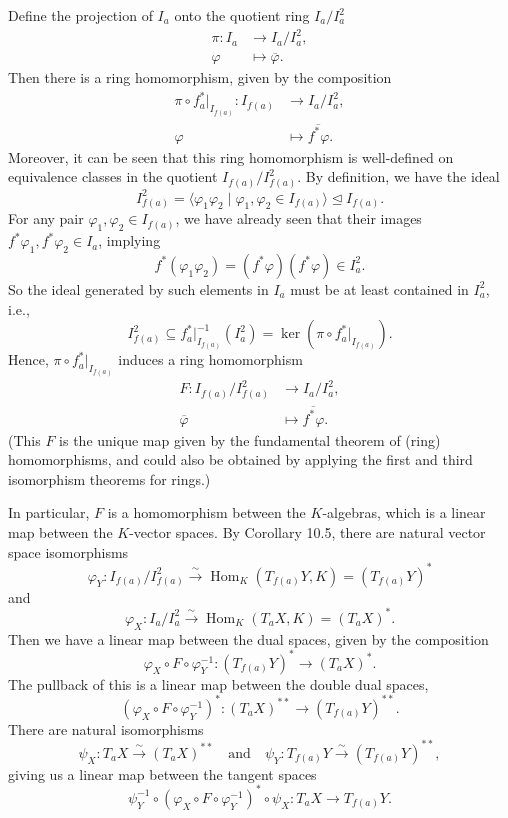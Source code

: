 \documentclass[12pt]{article}
\newcommand{\isp}[1]{\quad\text{#1}\quad}
\renewcommand{\phi}{\varphi}
\newcommand{\<}{\langle}
\renewcommand{\>}{\rangle}
\newcommand{\eqc}{\overline}
\newcommand{\teq}{\trianglelefteq}
\DeclareMathOperator{\Hom}{Hom}
\begin{document}
Define the projection of $I_a$ onto the quotient ring $I_a/I_a^2$
\begin{align*}
    \pi : I_a &\to I_a/I_a^2, \\
        \phi &\mapsto \eqc{\phi}.
\end{align*}
Then there is a ring homomorphism, given by the composition 
\begin{align*}
    \pi \circ f^*_a|_{I_{f(a)}} : I_{f(a)} &\to I_a/I_a^2, \\
        \phi &\mapsto \eqc{f^*\phi}.
\end{align*}
Moreover, it can be seen that this ring homomorphism is well-defined on equivalence classes in the quotient $I_{f(a)}/I_{f(a)}^2$. By definition, we have the ideal
\[
    I_{f(a)}^2 = \<\phi_1\phi_2 \mid \phi_1, \phi_2 \in I_{f(a)}\> \teq I_{f(a)}.
\]
For any pair $\phi_1, \phi_2 \in I_{f(a)}$, we have already seen that their images $f^*\phi_1, f^*\phi_2 \in I_a$, implying
\[
    f^*(\phi_1\phi_2) = (f^*\phi)(f^*\phi) \in I_a^2.
\]
So the ideal generated by such elements in $I_a$ must be at least contained in $I_a^2$, i.e.,
\[
    I_{f(a)}^2 \subseteq f^*_a|_{I_{f(a)}}^{-1}(I_a^2) = \ker(\pi \circ f^*_a|_{I_{f(a)}}).
\]
Hence, $\pi \circ f^*_a|_{I_{f(a)}}$ induces a ring homomorphism 
\begin{align*}
    F : I_{f(a)}/I_{f(a)}^2 &\to I_a/I_a^2, \\
        \eqc{\phi} &\mapsto \eqc{f^*\phi}.
\end{align*}
(This $F$ is the unique map given by the fundamental theorem of (ring) homomorphisms, and could also be obtained by applying the first and third isomorphism theorems for rings.)

In particular, $F$ is a homomorphism between the $K$-algebras, which is a linear map between the $K$-vector spaces. By Corollary 10.5, there are natural vector space isomorphisms
\[
    \phi_Y : I_{f(a)}/I_{f(a)}^2 \xrightarrow{\sim} \Hom_K(T_{f(a)}Y, K) = (T_{f(a)}Y)^*
\]
and
\[
    \phi_X :  I_a/I_a^2 \xrightarrow{\sim} \Hom_K(T_aX, K) = (T_aX)^*.
\]
Then we have a linear map between the dual spaces, given by the composition
\[
    \phi_X \circ F \circ \phi_Y^{-1} : (T_{f(a)}Y)^* \to (T_aX)^*.
\]
The pullback of this is a linear map between the double dual spaces,
\[
    (\phi_X \circ F \circ \phi_Y^{-1})^* : (T_aX)^{**} \to (T_{f(a)}Y)^{**}.
\]
There are natural isomorphisms
\[
    \psi_X : T_aX \xrightarrow{\sim} (T_aX)^{**}
    \isp{and}
    \psi_Y : T_{f(a)}Y \xrightarrow{\sim} (T_{f(a)}Y)^{**},
\]
giving us a linear map between the tangent spaces
\[
    \psi_Y^{-1} \circ (\phi_X \circ F \circ \phi_Y^{-1})^* \circ \psi_X : T_aX \to T_{f(a)}Y.
\]
\end{document}
